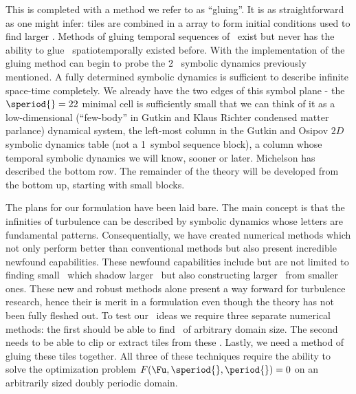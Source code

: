 This is completed with a method we refer to as ``gluing''. It is as straightforward as one
might infer: tiles are combined in a {\spt} array to form initial conditions used to find larger
\twots. Methods of gluing temporal sequences of \twots\ exist but never has the ability to
glue \twots\ spatiotemporally existed before.
With the implementation of the gluing method can begin to
probe the 2\dmn\ {\spt} symbolic dynamics
previously mentioned. A fully determined symbolic dynamics is sufficient
to describe infinite space-time completely.
We already have the two edges of this symbol plane - the $\speriod{}=22$ minimal
cell is sufficiently small that we can think of it as
a low-dimensional (``few-body'' in Gutkin and Klaus
Richter condensed matter parlance)
dynamical system, the left-most column in the Gutkin and
Osipov $2D$ symbolic dynamics {\spt} table (not a
1\dmn\ symbol sequence block), a column whose temporal symbolic dynamics
we will know, sooner or later. Michelson has described the
bottom row. The remainder of the theory will be developed from the
bottom up, starting with small {\spt} blocks.

The plans for our {\spt} formulation have been laid bare. The main concept is that the infinities
of turbulence can be described by {\spt} symbolic dynamics whose letters are fundamental {\spt}
patterns. Consequentially, we have created numerical methods which not only perform better than
conventional methods but also present incredible newfound capabilities. These newfound capabilities
include but are not limited to finding small \twots\ which shadow larger \twots\ but also constructing
larger \twots\ from smaller ones. These new and robust methods alone present a way forward for turbulence research, hence their is merit in a {\spt} formulation even though the theory has not
been fully fleshed out.
To test our \spt\ ideas we require three separate numerical methods: the first
should be able to find \twots\ of arbitrary domain size. The second needs to be able to
clip or extract tiles from these \twots. Lastly, we need a method of
gluing these tiles together. All three of these techniques require the ability
to solve the optimization problem $F(\Fu,\speriod{},\period{})=0$
on an arbitrarily sized doubly periodic domain.

